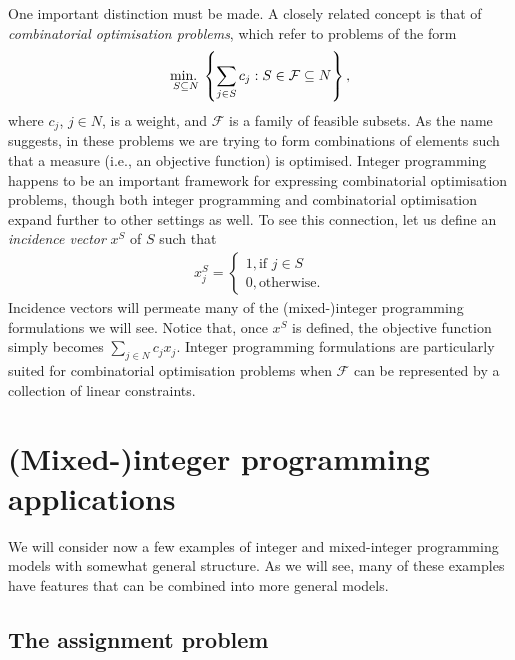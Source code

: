 One important distinction must be made. A closely related concept is that of \emph{combinatorial optimisation problems}, which refer to problems of the form
%
\begin{align*}
 	\mathop{\text{min.~}}_{S \subseteq N} \left\{ \sum_{j \in S} c_j : S \in \mathcal{F} \subseteq N \right \},
\end{align*}
%
where $c_j$, $j \in N$, is a weight, and $\mathcal{F}$ is a family of feasible subsets. As the name suggests, in these problems we are trying to form combinations of elements such that a measure (i.e., an objective function) is optimised. Integer programming happens to be an important framework for expressing combinatorial optimisation problems, though both integer programming and combinatorial optimisation expand further to other settings as well. To see this connection, let us define an \emph{incidence vector} $x^S$ of $S$ such that
%
  \begin{align*}
	  x^S_j = \begin{cases}
	       1, \text{if } j \in S \\ 
	       0, \text{otherwise}.
	     \end{cases}
  \end{align*}
%
Incidence vectors will permeate many of the (mixed-)integer programming formulations we will see. Notice that, once $x^S$ is defined, the objective function simply becomes $\sum_{j \in N} c_j x_j$. Integer programming formulations are particularly suited for combinatorial optimisation problems when $\mathcal{F}$ can be represented by a collection of linear constraints. 


\section{(Mixed-)integer programming applications}

We will consider now a few examples of integer and mixed-integer programming models with somewhat general structure. As we will see, many of these examples have features that can be combined into more general models.


\subsection{The assignment problem}

